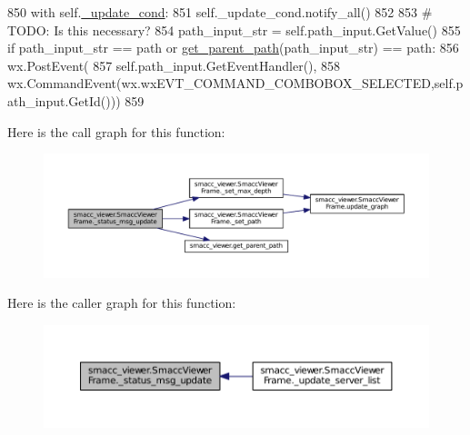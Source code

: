 \begin{DoxyCode}
850                 with self.\hyperlink{classsmacc__viewer_1_1SmaccViewerFrame_a87c1757aa21438ca8692b2f079b8f393}{\_update\_cond}:
851                     self.\_update\_cond.notify\_all()
852 
853             \textcolor{comment}{# TODO: Is this necessary?}
854             path\_input\_str = self.path\_input.GetValue()
855             \textcolor{keywordflow}{if} path\_input\_str == path \textcolor{keywordflow}{or} \hyperlink{namespacesmacc__viewer_a75fe995cc084c8e1bcbf45bfd7618638}{get\_parent\_path}(path\_input\_str) == path:
856                 wx.PostEvent(
857                         self.path\_input.GetEventHandler(),
858                         wx.CommandEvent(wx.wxEVT\_COMMAND\_COMBOBOX\_SELECTED,self.path\_input.GetId()))
859 
\end{DoxyCode}


Here is the call graph for this function\+:
\nopagebreak
\begin{figure}[H]
\begin{center}
\leavevmode
\includegraphics[width=350pt]{classsmacc__viewer_1_1SmaccViewerFrame_af5e341bd874c8402738aec02cc598cca_cgraph}
\end{center}
\end{figure}




Here is the caller graph for this function\+:
\nopagebreak
\begin{figure}[H]
\begin{center}
\leavevmode
\includegraphics[width=350pt]{classsmacc__viewer_1_1SmaccViewerFrame_af5e341bd874c8402738aec02cc598cca_icgraph}
\end{center}
\end{figure}


